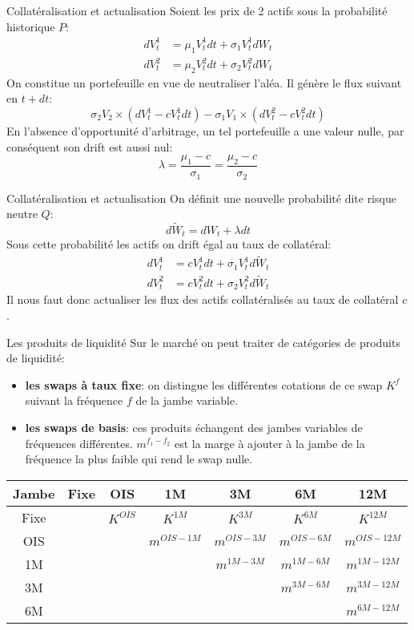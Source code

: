 \documentclass{beamer}
\begin{document}
\begin{frame}{Collatéralisation et actualisation}
Soient les prix de 2 actifs sous la probabilité historique $P$:
\[
\begin{split}
dV^1_t&=\mu_1 V^1_t dt + \sigma_1 V^1_t dW_t\\
dV^2_t&=\mu_2 V^2_t dt + \sigma_2 V^2_t dW_t
\end{split}
\]
On constitue un portefeuille en vue de neutraliser l'aléa. Il génère le flux suivant en $t+dt$:
\[
\sigma_2 V_2 \times (dV^1_t - c V^1_t dt)-\sigma_1 V_1 \times (dV^2_t - c V^2_t dt)
\]
En l'absence d'opportunité d'arbitrage, un tel portefeuille a une valeur nulle, par conséquent son drift est aussi nul:
\[
\lambda=\frac{\mu_1-c}{\sigma_1}=\frac{\mu_2-c}{\sigma_2}
\]
\end{frame}

\begin{frame}{Collatéralisation et actualisation}
On définit une nouvelle probabilité dite risque neutre $Q$:\\
\[
d\widetilde{W}_t=dW_t+\lambda dt
\]
Sous cette probabilité les actifs on drift égal au taux de collatéral:\\
\[
\begin{split}
dV^1_t&=c V^1_t dt + \sigma_1 V^1_t d\widetilde{W}_t\\
dV^2_t&=c V^2_t dt + \sigma_2 V^2_t d\widetilde{W}_t
\end{split}
\]
Il nous faut donc actualiser les flux des actifs collatéralisés au taux de collatéral $c$.

\end{frame}

\begin{frame}{Les produits de liquidité}
Sur le marché on peut traiter de catégories de produits de liquidité:
\begin{itemize}
\item \textbf{les swaps à taux fixe}: on distingue les différentes cotations de ce swap $K^f$ suivant la fréquence $f$ de la jambe variable.\\
\item \textbf{les swaps de basis}: ces produits échangent des jambes variables de fréquences différentes. $m^{f_1-f_2}$ est la marge à ajouter à la jambe de la fréquence la plus faible qui rend le swap nulle.\\ 
\end{itemize}
\small
\begin{center}
\begin{tabular}{|c|c|c|c|c|c|c|}
\hline
Jambe&Fixe&OIS&1M&3M&6M&12M\\
\hline
Fixe&&$K^{OIS}$&$K^{1M}$&$K^{3M}$&$K^{6M}$&$K^{12M}$\\
\hline
OIS&&&$m^{OIS-1M}$&$m^{OIS-3M}$&$m^{OIS-6M}$&$m^{OIS-12M}$\\
1M&&&&$m^{1M-3M}$&$m^{1M-6M}$&$m^{1M-12M}$\\
3M&&&&&$m^{3M-6M}$&$m^{3M-12M}$\\
6M&&&&&&$m^{6M-12M}$\\
\hline
\end{tabular}
\end{center}
\end{frame}
\end{document}
